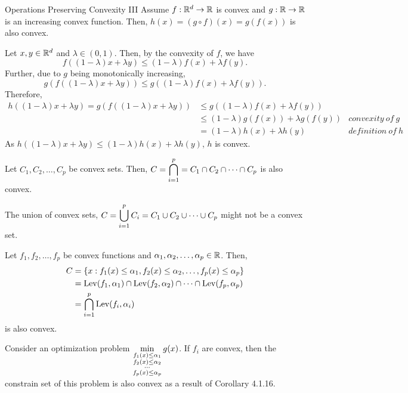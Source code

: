 \begin{thm}{Operations Preserving Convexity III}
	Assume $f:{\mathbb{R}}^d\to{\mathbb{R}}$ is convex and $g:{\mathbb{R}}\to{\mathbb{R}}$ is an increasing convex function. Then, $h(x)=(g\circ f)(x)=g(f(x))$ is also convex.
\end{thm}
\begin{prf}
	Let $x,y\in{\mathbb{R}}^d$ and $\lambda\in(0,1)$. Then, by the convexity of $f$, we have \[f((1-\lambda)x+\lambda y)\leq(1-\lambda)f(x)+\lambda f(y).\] Further, due to $g$ being monotonically increasing, \[g(f((1-\lambda)x+\lambda y))\leq g((1-\lambda)f(x)+\lambda f(y)).\] Therefore, \begin{align*}h((1-\lambda)x+\lambda y)=g(f((1-\lambda)x+\lambda y))&\leq g((1-\lambda)f(x)+\lambda f(y))\\&\leq (1-\lambda)g(f(x))+\lambda g(f(y))&convexity\ of\ g\\&=(1-\lambda)h(x)+\lambda h(y)& definition\ of\ h\end{align*} As $h((1-\lambda)x+\lambda y)\leq(1-\lambda)h(x)+\lambda h(y)$, $h$ is convex.
\end{prf}
\begin{clm}
	Let $C_1,C_2,\dots,C_p$ be convex sets. Then, $C=\displaystyle\bigcap_{i=1}^p=C_1\cap C_2\cap\cdots\cap C_p$ is also convex. 
\end{clm}
\begin{rmk}
	The union of convex sets, $C=\displaystyle\bigcup_{i=1}^pC_i=C_1\cup C_2\cup\cdots\cup C_p$	might not be a convex set. 
\end{rmk}
\begin{cor}{}
	Let $f_1,f_2,\dots,f_p$ be convex functions and $\alpha_1,\alpha_2,\dots,\alpha_p\in{\mathbb{R}}$. Then, \begin{align*}C&=\qty{x:f_1(x)\leq\alpha_1,f_2(x)\leq\alpha_2,\dots,f_p(x)\leq\alpha_p}\\&=\operatorname{Lev}(f_1,\alpha_1)\cap\operatorname{Lev}(f_2,\alpha_2)\cap\cdots\cap\operatorname{Lev}(f_p,\alpha_p)\\&=\bigcap_{i=1}^p\operatorname{Lev}(f_i,\alpha_i)\end{align*} is also convex.
\end{cor}
\begin{rmk}
	Consider an optimization problem $\displaystyle\min_{\substack{f_1(x)\leq\alpha_1\\f_2(x)\leq\alpha_2\\\cdots\\f_p(x)\leq\alpha_p}}g(x)$. If $f_i$ are convex, then the constrain set of this problem is also convex as a result of Corollary 4.1.16.
\end{rmk}
